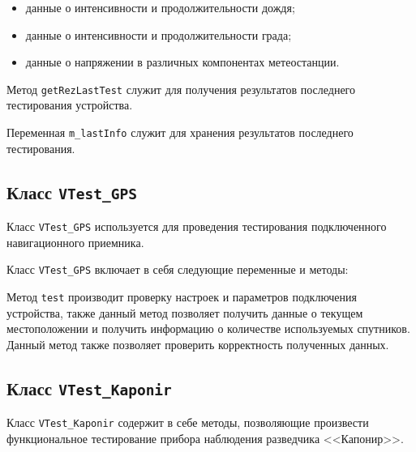 \begin{enum}
\begin{itemize}
			\item данные о интенсивности и продолжительности дождя;
			\item данные о интенсивности и продолжительности града;
			\item данные о напряжении в различных компонентах метеостанции.
		\end{itemize}
	\item Метод \texttt{getRezLastTest} служит для получения результатов последнего тестирования устройства.
	\item Переменная \texttt{m\_lastInfo} служит для хранения результатов последнего тестирования.
\end{enum}

\subsection{Класс \texttt{VTest\_GPS}}
Класс \texttt{VTest\_GPS} используется для проведения тестирования подключенного навигационного приемника.

Класс \texttt{VTest\_GPS} включает в себя следующие переменные и методы:
\begin{enum}
	\item Метод \texttt{test} производит проверку настроек и параметров подключения устройства, также данный метод
		позволяет получить данные о текущем местоположении и получить информацию о количестве используемых
		спутников. Данный метод также позволяет проверить корректность полученных данных.
\end{enum}


\subsection{Класс \texttt{VTest\_Kaponir}}
Класс \texttt{VTest\_Kaponir} содержит в себе методы, позволяющие произвести функциональное тестирование прибора
наблюдения разведчика <<Капонир>>.

